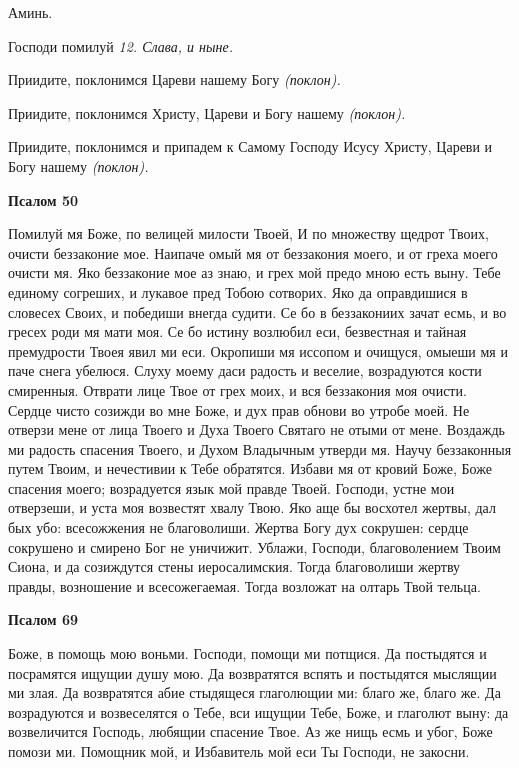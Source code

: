    Аминь.


   Господи помилуй \itshape 12\normalfont{}. \itshape Слава, и ныне\normalfont{}.


   Приидите, поклонимся Цареви нашему Богу \itshape (поклон)\normalfont{}.


   Приидите, поклонимся Христу, Цареви и Богу нашему \itshape (поклон)\normalfont{}.


   Приидите, поклонимся и припадем к Самому Господу Исусу Христу,
Цареви и Богу нашему \itshape (поклон)\normalfont{}.






 

\bfseries Псалом 50\normalfont{}


   Помилуй мя Боже, по велицей милости Твоей, И по множеству щедрот
Твоих, очисти беззаконие мое. Наипаче омый мя от беззакония моего, и от
греха моего очисти мя. Яко беззаконие мое аз знаю, и грех мой предо мною
есть выну. Тебе единому согреших, и лукавое пред Тобою сотворих. Яко да
оправдишися в словесех Своих, и победиши внегда судити. Се бо в
беззакониих зачат есмь, и во гресех роди мя мати моя. Се бо истину
возлюбил еси, безвестная и тайная премудрости Твоея явил ми еси.
Окропиши мя иссопом и очищуся, омыеши мя и паче снега убелюся. Слуху
моему даси радость и веселие, возрадуются кости смиренныя. Отврати лице
Твое от грех моих, и вся беззакония моя очисти. Сердце чисто созижди во
мне Боже, и дух прав обнови во утробе моей. Не отверзи мене от
лица Твоего и Духа Твоего Святаго не отыми от мене. Воздаждь ми
радость спасения Твоего, и Духом Владычным утверди мя. Научу
беззаконныя путем Твоим, и нечестивии к Тебе обратятся. Избави мя от
кровий Боже, Боже спасения моего; возрадуется язык мой правде
Твоей. Господи, устне мои отверзеши, и уста моя возвестят хвалу
Твою. Яко аще бы восхотел жертвы, дал бых убо: всесожжения не
благоволиши. Жертва Богу дух сокрушен: сердце сокрушено и смирено
Бог не уничижит. Ублажи, Господи, благоволением Твоим Сиона, и
да созиждутся стены иеросалимския. Тогда благоволиши жертву
правды, возношение и всесожегаемая. Тогда возложат на олтарь Твой
тельца.






 

\bfseries Псалом 69\normalfont{}


   Боже, в помощь мою воньми. Господи, помощи ми потщися. Да
постыдятся и посрамятся ищущии душу мою. Да возвратятся вспять
и постыдятся мыслящии ми злая. Да возвратятся абие стыдящеся
глаголющии ми: благо же, благо же. Да возрадуются и возвеселятся о
Тебе, вси ищущии Тебе, Боже, и глаголют выну: да возвеличится
Господь, любящии спасение Твое. Аз же нищь есмь и убог, Боже
помози ми. Помощник мой, и Избавитель мой еси Ты Господи, не
закосни.






